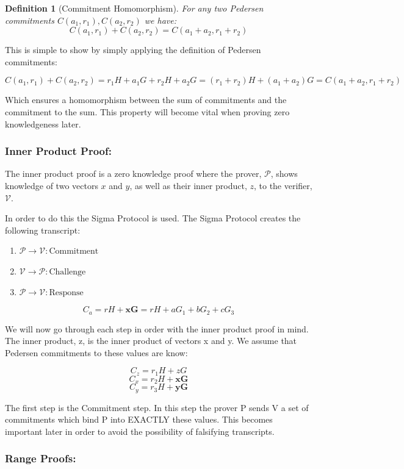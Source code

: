 \documentclass{article}
\newtheorem{definition}{Definition}[section]
\begin{document}
\begin{definition}[Commitment Homomorphism]
For any two Pedersen commitments $C(a_1,r_1), C(a_2,r_2)$ we have:
$$ C(a_1,r_1) + C(a_2,r_2) = C(a_1 + a_2, r_1 + r_2)$$
\end{definition}

This is simple to show by simply applying the definition of Pedersen commitments: 

$$C(a_1,r_1) + C(a_2,r_2) = r_1H + a_1G + r_2H + a_2G = (r_1 + r_2)H + (a_1 + a_2)G = C(a_1+a_2,r_1+r_2)$$

Which ensures a homomorphism between the sum of commitments and the commitment to the sum. This property will become vital when proving zero knowledgeness later. 

\subsubsection{Inner Product Proof:}

The inner product proof is a zero knowledge proof where the prover, $\mathcal{P}$, shows knowledge of two vectors $x$ and $y$, as well as their inner product, $z$, to the verifier, $\mathcal{V}$. 

In order to do this the Sigma Protocol is used. The Sigma Protocol creates the following transcript: 

\begin{enumerate}
	\item $\mathcal{P} \rightarrow \mathcal{V}: \text{Commitment}$
	\item $\mathcal{V} \rightarrow \mathcal{P}: \text{Challenge}$
	\item $\mathcal{P} \rightarrow \mathcal{V}: \text{Response}$
\end{enumerate}

$$C_a = rH + \mathbf{xG} = rH + aG_1 + bG_2 + cG_3$$

We will now go through each step in order with the inner product proof in mind. The inner product, z, is the inner product of vectors x and y. We assume that Pedersen commitments to these values are know:

$$C_z = r_1H + zG$$
$$C_x = r_2H + \mathbf{xG}$$
$$C_y = r_3H + \mathbf{yG}$$

The first step is the Commitment step. In this step the prover P sends V a set of commitments which bind P into EXACTLY these values. This becomes important later in order to avoid the possibility of falsifying transcripts. 

\subsubsection{Range Proofs:}
\end{document}
